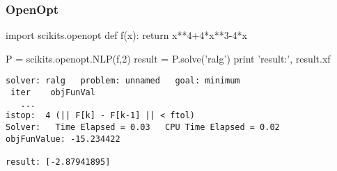 \begin{frame}[fragile]
\frametitle{OpenOpt}

\begin{python}
import scikits.openopt
def f(x):
    return x**4+4*x**3-4*x

P = scikits.openopt.NLP(f,2)
result = P.solve('ralg')
print 'result:', result.xf
\end{python}
\begin{verbatim}
solver: ralg   problem: unnamed   goal: minimum
 iter    objFunVal
   ...
istop:  4 (|| F[k] - F[k-1] || < ftol)
Solver:   Time Elapsed = 0.03   CPU Time Elapsed = 0.02
objFunValue: -15.234422

result: [-2.87941895]
\end{verbatim}

\end{frame}


